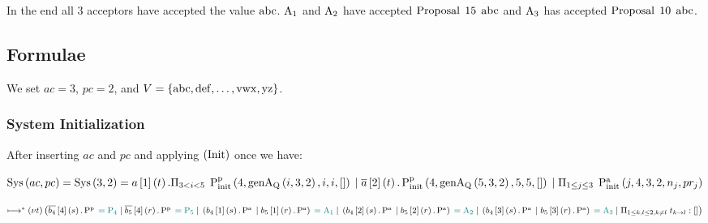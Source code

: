 In the end all $3$ acceptors have accepted the value $\ABC$.
$\Acceptor{1}$ and $\Acceptor{2}$ have accepted $\ProposalC{15}{\ABC}$ and $\Acceptor{3}$ has accepted $\ProposalC{10}{\ABC}$.

\subsection{Formulae}
We set $ac = 3$, $pc = 2$, and $V=\Curly{\ABC, \operatorname{def}, \dots, \operatorname{vwx}, \operatorname{yz}}$.

\subsubsection{System Initialization}
After inserting $ac$ and $pc$ and applying $\Init$ once we have:

$\Sys{ac}{pc} = \Sys{3}{2} =
\SessionAccept{a}{1}{t}.\ParallelFor{3 < i < 5} \PpInit{4}{\genAq{i}{3}{2}}{i}{i}{[]}\\
\Or \SessionRequest{a}{2}{t}.\PpInit{4}{\genAq{5}{3}{2}}{5}{5}{[]}\\
\Or \ParallelFor{1 \le j \le 3} \PaInit{j}{4}{3}{2}{n_j}{pr_j}$



$\mapstostar
\Nu{t}\big (
\SessionRequest{b_4}{4}{s}.\Pp \comment{= \Proposer{4}}\\
\Or \SessionRequest{b_5}{4}{r}.\Pp \comment{= \Proposer{5}}\\
\Or \Paren{\SessionAccept{b_4}{1}{s}.\Pa \Or \SessionAccept{b_5}{1}{r}.\Pa} \comment{= \Acceptor{1}}\\
\Or \Paren{\SessionAccept{b_4}{2}{s}.\Pa \Or \SessionAccept{b_5}{2}{r}.\Pa} \comment{= \Acceptor{2}}\\
\Or \Paren{\SessionAccept{b_4}{3}{s}.\Pa \Or \SessionAccept{b_5}{3}{r}.\Pa} \comment{= \Acceptor{3}}\\
\Or \OuterSessionQueues
\big )$

